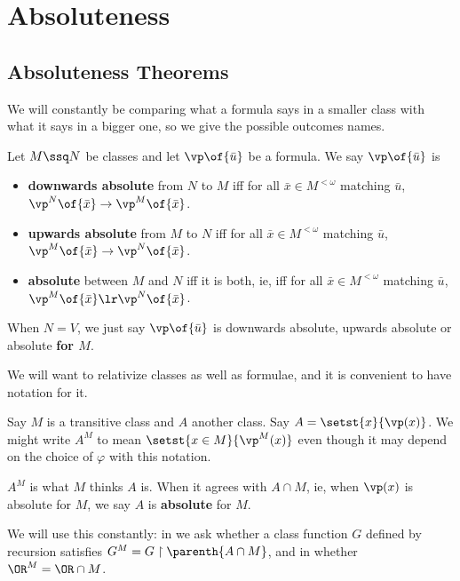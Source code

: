 \section{Absoluteness} \label{Ch3:Sec:Absoluteness}

\subsection{Absoluteness Theorems}

We will constantly be comparing what a formula says in a smaller class with what it says in a bigger one, so we give the possible outcomes names.

\begin{boxdefinition}[Absoluteness]
    Let $M \ssq N$ be classes and let $\vp\of{\bar{u}}$ be a formula. We say $\vp\of{\bar{u}}$ is
    \begin{itemize}
        \item \textbf{downwards absolute} from $N$ to $M$ iff for all $\bar{x} \in M^{<\omega}$ matching $\bar{u}$, $\vp^N\of{\bar{x}} \to \vp^M\of{\bar{x}}$.
        \item \textbf{upwards absolute} from $M$ to $N$ iff for all $\bar{x} \in M^{<\omega}$ matching $\bar{u}$, $\vp^M\of{\bar{x}} \to \vp^N\of{\bar{x}}$.
        \item \textbf{absolute} between $M$ and $N$ iff it is both, ie, iff for all $\bar{x} \in M^{<\omega}$ matching $\bar{u}$, $\vp^M\of{\bar{x}} \lr \vp^N\of{\bar{x}}$.
    \end{itemize}
    When $N = V$, we just say $\vp\of{\bar{u}}$ is downwards absolute, upwards absolute or absolute \textbf{for $M$}.
\end{boxdefinition}

We will want to relativize classes as well as formulae, and it is convenient to have notation for it.

\begin{boxnotation}
    Say $M$ is a transitive class and $A$ another class. Say $A = \setst{x}{\vp(x)}$. We might write $A^M$ to mean $\setst{x \in M}{\vp^M(x)}$ even though it may depend on the choice of $\varphi$ with this notation.

    $A^M$ is what $M$ thinks $A$ is. When it agrees with $A \cap M$, ie, when $\vp(x)$ is absolute for $M$, we say $A$ is \textbf{absolute} for $M$.
\end{boxnotation}

We will use this constantly: in  we ask whether a class function $G$ defined by recursion satisfies $G^M = G \restriction \parenth{A \cap M}$, and in  whether $\OR^M = \OR \cap M$.

